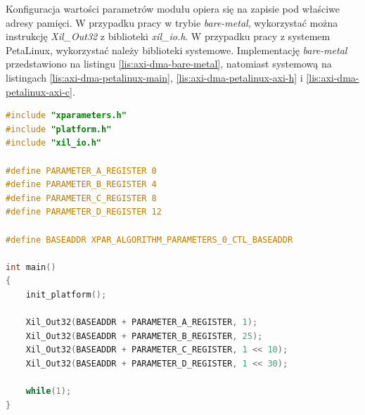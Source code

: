 Konfiguracja wartości parametrów modułu opiera się na zapisie pod właściwe adresy pamięci. %
W przypadku pracy w trybie \textit{bare-metal}, wykorzystać można instrukcję \emph{Xil\_Out32} z biblioteki \emph{xil\_io.h}. 
W przypadku pracy z systemem PetaLinux, wykorzystać należy biblioteki systemowe. 
Implementację\textit{ bare-metal} przedstawiono na listingu \ref{lis:axi-dma-bare-metal}, natomiast systemową na listingach \ref{lis:axi-dma-petalinux-main}, \ref{lis:axi-dma-petalinux-axi-h} i \ref{lis:axi-dma-petalinux-axi-c}.

\begin{lstlisting}[breaklines, language=C, label=lis:axi-dma-bare-metal, caption=Obsługa modułu w trybie bare-metal.]
#include "xparameters.h"
#include "platform.h"
#include "xil_io.h"

#define PARAMETER_A_REGISTER 0
#define PARAMETER_B_REGISTER 4
#define PARAMETER_C_REGISTER 8
#define PARAMETER_D_REGISTER 12

#define BASEADDR XPAR_ALGORITHM_PARAMETERS_0_CTL_BASEADDR

int main()
{
	init_platform();
	
	Xil_Out32(BASEADDR + PARAMETER_A_REGISTER, 1);
	Xil_Out32(BASEADDR + PARAMETER_B_REGISTER, 25);
	Xil_Out32(BASEADDR + PARAMETER_C_REGISTER, 1 << 10);
	Xil_Out32(BASEADDR + PARAMETER_D_REGISTER, 1 << 30);
	
	while(1);
}
\end{lstlisting}


